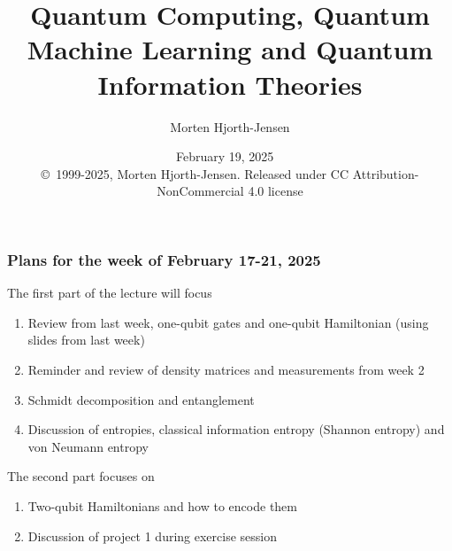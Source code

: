 \documentclass{beamer}
\begin{document}

\newcommand{\exercisesection}[1]{\subsection*{#1}}







\title{Quantum Computing, Quantum Machine Learning and Quantum Information Theories}


\author{Morten Hjorth-Jensen}

\date{February 19, 2025
\ \\ 
{\tiny \copyright\ 1999-2025, Morten Hjorth-Jensen. Released under CC Attribution-NonCommercial 4.0 license}
}

\begin{frame}
\titlepage
\end{frame}

\begin{frame}
\frametitle{Plans for the week of February 17-21, 2025}

\begin{block}{}
The first part of the lecture will focus
\begin{enumerate}
\item Review from last week, one-qubit gates and one-qubit Hamiltonian (using slides from last week)

\item Reminder and review of  density matrices and measurements from week 2

\item Schmidt decomposition and entanglement

\item Discussion of entropies, classical information entropy (Shannon entropy) and von Neumann entropy
\end{enumerate}

\noindent
The second part focuses on 
\begin{enumerate}
\item Two-qubit Hamiltonians and how to encode them

\item Discussion of project 1 during exercise session
\end{enumerate}

\noindent
\end{block}
\end{frame}
\end{document}
